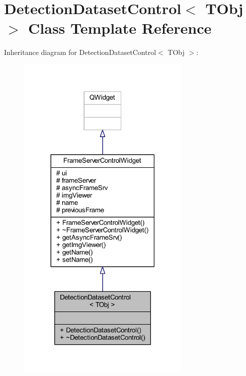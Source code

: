 \hypertarget{class_detection_dataset_control}{}\section{Detection\+Dataset\+Control$<$ T\+Obj $>$ Class Template Reference}
\label{class_detection_dataset_control}


Inheritance diagram for Detection\+Dataset\+Control$<$ T\+Obj $>$\+:
\nopagebreak
\begin{figure}[H]
\begin{center}
\leavevmode
\includegraphics[width=234pt]{class_detection_dataset_control__inherit__graph}
\end{center}
\end{figure}


